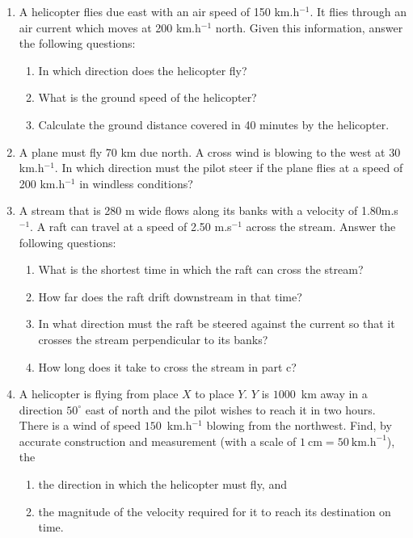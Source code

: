 \begin{enumerate}

\item A helicopter flies due east with an air speed of 150 km.h$^{-1}$. It flies through an air current which moves at 200 km.h$^{-1}$ north. Given this information, answer the following questions:
\begin{enumerate} 
\item In which direction does the helicopter fly? 
\item What is the ground speed of the helicopter? 
\item Calculate the ground distance covered in 40 minutes by the helicopter. \end{enumerate}

\item A plane must fly 70 km due north. A cross wind is blowing to the west at 30 km.h$^{-1}$. In which direction must the pilot steer if the plane flies at a speed of 200 km.h$^{-1}$ in windless conditions?

\item A stream that is 280 m wide flows along its banks with a velocity of 1.80m.s$^{-1}$. A raft can travel at a speed of 2.50 m.s$^{-1}$ across the stream. Answer the following questions: 
\begin{enumerate} 
\item What is the shortest time in which the raft can cross the stream? 
\item How far does the raft drift downstream in that time? 
\item In what direction must the raft be steered against the current so that it crosses the stream perpendicular to its banks? 
\item How long does it take to cross the stream in part c? 
\end{enumerate}

\item{A helicopter is flying from place $X$ to place $Y$. $Y$ is $1000$~km away in a direction $50^{\circ}$ east of north and the pilot wishes to reach it in two hours. There is a wind of speed $150$~km.h$^{-1}$ blowing from the northwest. Find, by accurate construction and measurement (with a scale of $1~\mathrm{cm} = 50~\mathrm{km.h}^{-1}$), the 
\begin{enumerate} 
\item the direction in which the helicopter must fly, and 
\item the magnitude of the velocity required for it to reach its destination on time. 
\end{enumerate}
}


\end{enumerate}
